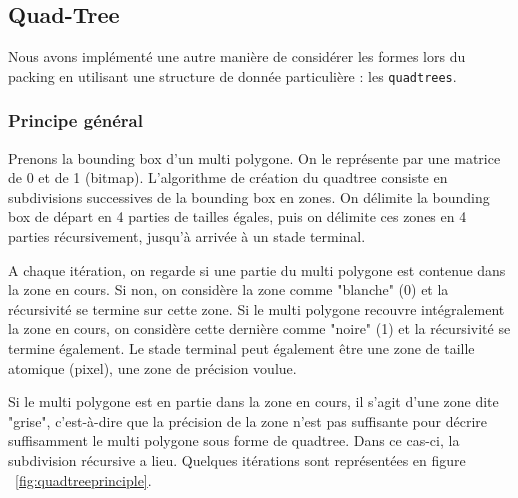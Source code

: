 \subsection{Quad-Tree}

Nous avons implémenté une autre manière de considérer les formes lors du packing en utilisant une structure de donnée particulière : les \texttt{quadtrees}.

\subsubsection{Principe général}

Prenons la bounding box d'un multi polygone. On le représente par une matrice de 0 et de 1 (bitmap). L'algorithme de création du quadtree consiste en subdivisions successives de la bounding box en zones. On délimite la bounding box de départ en 4 parties de tailles égales, puis on délimite ces zones en 4 parties récursivement, jusqu'à arrivée à un stade terminal.

A chaque itération, on regarde si une partie du multi polygone est contenue dans la zone en cours. Si non, on considère la zone comme "blanche" (0) et la récursivité se termine sur cette zone. Si le multi polygone recouvre intégralement la zone en cours, on considère cette dernière comme "noire" (1) et la récursivité se termine également. Le stade terminal peut également être une zone de taille atomique (pixel), une zone de précision voulue. 

Si le multi polygone est en partie dans la zone en cours, il s'agit d'une zone dite "grise", c'est-à-dire que la précision de la zone n'est pas suffisante pour décrire suffisamment le multi polygone sous forme de quadtree. Dans ce cas-ci, la subdivision récursive a lieu. Quelques itérations sont représentées en figure ~\ref{fig:quadtreeprinciple}.

